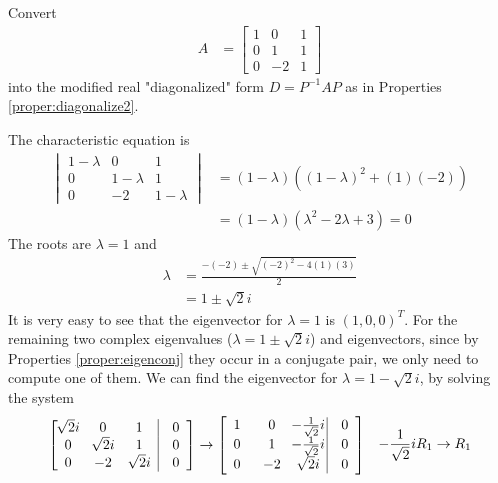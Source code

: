 \begin{exmp}
\label{ex8.2.2}
Convert
\begin{align*}
A &= 
\begin{bmatrix}
1 & 0 & 1 \\
0 & 1 & 1 \\
0 & -2 & 1
\end{bmatrix}
\end{align*}
into the modified real "diagonalized" form $D = P^{-1}AP$ as in Properties \ref{proper:diagonalize2}.
\end{exmp}
\begin{solution}
The characteristic equation is
\begin{align*}
\begin{vmatrix}
1-\lambda & 0 & 1 \\
0 & 1-\lambda & 1 \\
0 & -2 & 1-\lambda
\end{vmatrix} 
&=
(1-\lambda)((1-\lambda)^2 + (1)(-2)) \\
&= (1-\lambda)(\lambda^2 - 2\lambda + 3) = 0
\end{align*}
The roots are $\lambda = 1$ and
\begin{align*}
\lambda &= \frac{-(-2) \pm \sqrt{(-2)^2 - 4(1)(3)}}{2} \\
&= 1 \pm \sqrt{2}i
\end{align*}
It is very easy to see that the eigenvector for $\lambda = 1$ is $(1,0,0)^T$. For the remaining two complex eigenvalues ($\lambda = 1 \pm \sqrt{2}i$) and eigenvectors, since by Properties \ref{proper:eigenconj} they occur in a conjugate pair, we only need to compute one of them. We can find the eigenvector for $\lambda = 1 - \sqrt{2}i$, by solving the system
\begin{align*}
\left[\begin{array}{@{}wc{15pt}wc{15pt}wc{17pt}|wc{15pt}@{}}
\sqrt{2}i & 0 & 1 & 0 \\
0 & \sqrt{2}i & 1 & 0 \\
0 & -2 & \sqrt{2}i & 0
\end{array}\right] &\to  
\left[\begin{array}{@{}wc{15pt}wc{15pt}wc{17pt}|wc{15pt}@{}}
1 & 0 & -\frac{1}{\sqrt{2}}i & 0 \\
0 & 1 & -\frac{1}{\sqrt{2}}i & 0 \\
0 & -2 & \sqrt{2}i & 0
\end{array}\right] & \begin{aligned}
-\frac{1}{\sqrt{2}}i R_1 &\to R_1 \\

\end{aligned}
\end{align*}
\end{solution}
